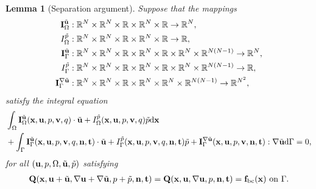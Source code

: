 \documentclass[oneside,11pt]{book}
\numberwithin{equation}{section}
\newtheorem{lemma}{Lemma}[section]
\begin{document}
\begin{enumerate}[leftmargin=0mm]
\begin{itemize}[leftmargin=0in]
        \begin{lemma}[Separation argument]
            \label{lemma: separation argument/general stationary Stokes/case 1.1}
            Suppose that the mappings
            \begin{align*}
                {\bf I}_\Omega^{\tilde{\bf u}}&:\mathbb{R}^N\times\mathbb{R}^N\times\mathbb{R}\times\mathbb{R}^N\times\mathbb{R}\to\mathbb{R}^N,\\
                I_\Omega^{\tilde{p}}&:\mathbb{R}^N\times\mathbb{R}^N\times\mathbb{R}\times\mathbb{R}^N\times\mathbb{R}\to\mathbb{R},\\
                {\bf I}_\Gamma^{\tilde{\bf u}}&:\mathbb{R}^N\times\mathbb{R}^N\times\mathbb{R}\times\mathbb{R}^N\times\mathbb{R}\times\mathbb{R}^N\times\mathbb{R}^{N(N-1)}\to\mathbb{R}^N,\\
                I_\Gamma^{\tilde{p}}&:\mathbb{R}^N\times\mathbb{R}^N\times\mathbb{R}\times\mathbb{R}^N\times\mathbb{R}\times\mathbb{R}^N\times\mathbb{R}^{N(N-1)}\to\mathbb{R},\\
                {\bf I}_\Gamma^{\nabla\tilde{\bf u}}&:\mathbb{R}^N\times\mathbb{R}^N\times\mathbb{R}\times\mathbb{R}^N\times\mathbb{R}^N\times\mathbb{R}^{N(N-1)}\to\mathbb{R}^{N^2},
            \end{align*}
            satisfy the integral equation
            \begin{align}
                \label{separation argument/general stationary Stokes/case 1.1/1}
                &\int_\Omega {\bf I}_\Omega^{\tilde{\bf u}}({\bf x},{\bf u},p,{\bf v},q)\cdot\tilde{\bf u} + I_\Omega^{\tilde{p}}({\bf x},{\bf u},p,{\bf v},q)\tilde{p}{\rm d}{\bf x}\nonumber\\
                &+ \int_\Gamma {\bf I}_\Gamma^{\tilde{\bf u}}({\bf x},{\bf u},p,{\bf v},q,{\bf n},{\bf t})\cdot\tilde{\bf u} + I_\Gamma^{\tilde{p}}({\bf x},{\bf u},p,{\bf v},q,{\bf n},{\bf t})\tilde{p} + {\bf I}_\Gamma^{\nabla\tilde{\bf u}}({\bf x},{\bf u},p,{\bf v},{\bf n},{\bf t}):\nabla\tilde{\bf u}{\rm d}\Gamma = 0,
            \end{align}
            for all $({\bf u},p,\Omega,\tilde{\bf u},\tilde{p})$ satisfying
            \begin{align}
                \label{separation argument/general stationary Stokes/case 1.1/2}
                {\bf Q}({\bf x},{\bf u} + \tilde{\bf u},\nabla{\bf u} + \nabla\tilde{\bf u},p + \tilde{p},{\bf n},{\bf t}) = {\bf Q}({\bf x},{\bf u},\nabla{\bf u},p,{\bf n},{\bf t}) = {\bf f}_{\rm bc}({\bf x})\mbox{ on }\Gamma.
            \end{align}

\end{lemma}
\end{itemize}
\end{enumerate}
\end{document}
